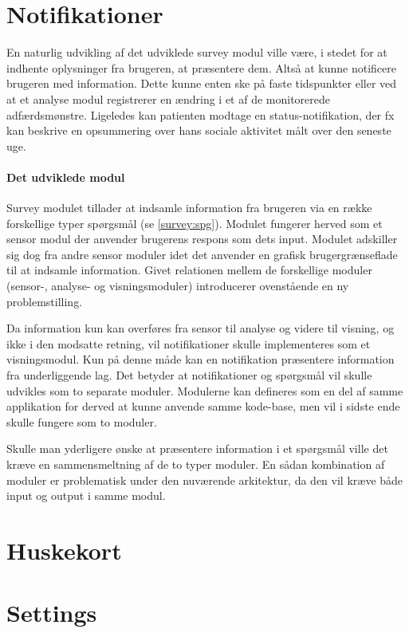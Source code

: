 \section{Notifikationer}
En naturlig udvikling af det udviklede survey modul ville være, i stedet for at indhente oplysninger fra brugeren, at præsentere dem.
Altså at kunne notificere brugeren med information.
Dette kunne enten ske på faste tidspunkter eller ved at et analyse modul registrerer en ændring i et af de monitorerede adfærdsmønstre.
Ligeledes kan patienten modtage en status-notifikation, der fx kan beskrive en opsummering over hans sociale aktivitet målt over den seneste uge.

\paragraph{Det udviklede modul}
Survey modulet tillader at indsamle information fra brugeren via en række forskellige typer spørgsmål (se \cref{survey:spg}).
Modulet fungerer herved som et sensor modul der anvender brugerens respons som dets input.
Modulet adskiller sig dog fra andre sensor moduler idet det anvender en grafisk brugergrænseflade til at indsamle information.
Givet relationen mellem de forskellige moduler (sensor-, analyse- og visningsmoduler) introducerer ovenstående en ny problemstilling.

Da information kun kan overføres fra sensor til analyse og videre til visning, og ikke i den modsatte retning, vil notifikationer skulle implementeres som et visningsmodul.
Kun på denne måde kan en notifikation præsentere information fra underliggende lag.
Det betyder at notifikationer og spørgsmål vil skulle udvikles som to separate moduler.
Modulerne kan defineres som en del af samme applikation for derved at kunne anvende samme kode-base, men vil i sidste ende skulle fungere som to moduler.

Skulle man yderligere ønske at præsentere information i et spørgsmål ville det kræve en sammensmeltning af de to typer moduler.
En sådan kombination af moduler er problematisk under den nuværende arkitektur, da den vil kræve både input og output i samme modul.

\section{Huskekort}

\section{Settings}
